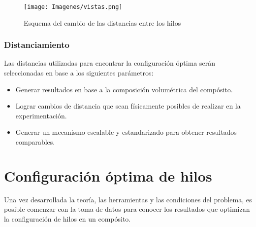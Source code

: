 \documentclass[12pt,letterpaper]{article}
\numberwithin{equation}{section}
\begin{document}
\begin{figure}[H]
	\centering\texttt{[image: Imagenes/vistas.png]}\\
	\caption{Esquema del cambio de las distancias entre los hilos}
	\label{fig:Pantalla vs bloque}
\end{figure}

\subsubsection{Distanciamiento}
Las distancias utilizadas para encontrar la configuración óptima serán seleccionadas en base a los siguientes parámetros:

\begin{itemize}
	\item Generar resultados en base a la composición volumétrica del compósito.
	\item Lograr cambios de distancia que sean físicamente posibles de realizar en la experimentación.
	\item Generar un mecanismo escalable y estandarizado para obtener resultados comparables.
\end{itemize} 
\pagebreak
\section{Configuración óptima de hilos}
Una vez desarrollada la teoría, las herramientas y las condiciones del problema, es posible comenzar con la toma de datos para conocer los resultados que optimizan la configuración de hilos en un compósito.
\end{document}
